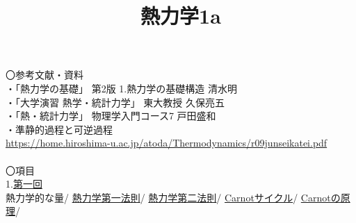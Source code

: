\documentclass{jsarticle}
\title{熱力学1a}
\author{}
\date{}
\begin{document}
\maketitle
\noindent
〇参考文献・資料\\
・「熱力学の基礎」 第2版 1.熱力学の基礎構造 清水明\\
・「大学演習 熱学・統計力学」 東大教授 久保亮五\\
・「熱・統計力学」 物理学入門コース7 戸田盛和\\
・準静的過程と可逆過程\\
\url{https://home.hiroshima-u.ac.jp/atoda/Thermodynamics/r09junseikatei.pdf}\\
\\
〇項目\\
1.\hyperlink{list1}{第一回}\\
熱力学的な量/
\hyperlink{熱力学第一法則}{熱力学第一法則}/
\hyperlink{熱力学第二法則}{熱力学第二法則}/
\hyperlink{Carnotサイクル}{Carnotサイクル}/
\hyperlink{Carnotの原理}{Carnotの原理}/\\


\newpage
\noindent
\end{document}
